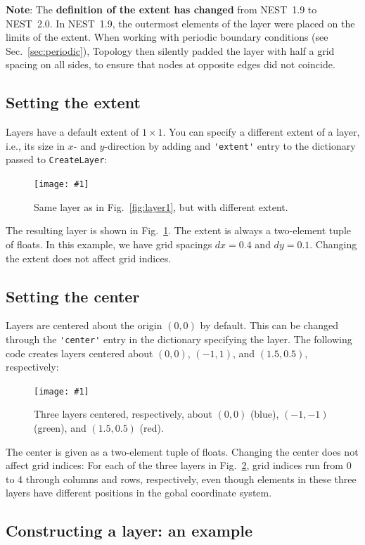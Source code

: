 \documentclass[a4paper,12pt]{report}
\newcommand{\scriptfig}[4]{%
\begin{figure}
\centerline{\texttt{[image: \#1]}}
\caption[#3]{#4}
\label{fig:#1}
\end{figure}%
}
\begin{document}
\textbf{Note}: The \textbf{definition of the extent has changed} from
NEST~1.9 to NEST~2.0. In NEST~1.9, the outermost elements of the layer
were placed on the limits of the extent. When working with periodic
boundary conditions (see Sec.~\ref{sec:periodic}), Topology then
silently padded the layer with half a grid spacing on all sides, to
ensure that nodes at opposite edges did not coincide.

\subsection{Setting the extent}\label{sec:setextent}

Layers have a default extent of $1\times 1$. 
You can specify a different extent of a layer, i.e., its size in $x$- and
$y$-direction by adding and \lstinline!'extent'! entry to the
dictionary passed to \lstinline!CreateLayer!:
%

\scriptfig{layer2}{0.8}{Layer with non-standard extent}%
{Same layer as in Fig.~\ref{fig:layer1}, but with different extent.}
%
The resulting layer is shown in Fig.~\ref{fig:layer2}. The extent is
always a two-element tuple of floats. In this example, we have grid
spacings $dx=0.4$ and $dy=0.1$. Changing the extent does not affect
grid indices.

\subsection{Setting the center}\label{sec:setcenter}

Layers are centered about the origin $(0,0)$ by default. This can be
changed through the \lstinline!'center'! entry in the dictionary
specifying the layer. The following code creates layers centered about
$(0,0)$, $(-1,1)$, and $(1.5,0.5)$, respectively:
%

\scriptfig{layer3}{0.8}{Layers with different centers}%
{Three layers centered, respectively, about $(0,0)$ (blue), $(-1,-1)$
  (green), and $(1.5,0.5)$ (red).}
%
The center is given as a two-element tuple of floats.
Changing the center does not affect grid indices: For each of the
three layers in Fig.~\ref{fig:layer3}, grid indices run from 0 to 4
through columns and rows, respectively, even though elements in these
three layers have different positions in the gobal coordinate system.

\subsection{Constructing a layer: an example}\label{sec:fixedlayerexample}
\end{document}
